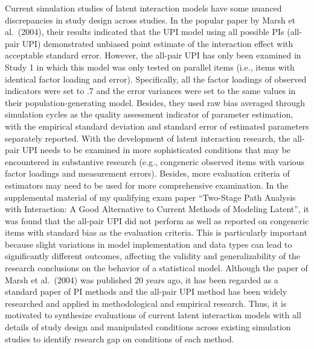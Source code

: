 \documentclass[
  11pt,
  man]{apa6}
\begin{document}
Current simulation studies of latent interaction models have some nuanced discrepancies in study design across studies. In the popular paper by Marsh et al.~(2004), their results indicated that the UPI model using all possible PIs (all-pair UPI) demonstrated unbiased point estimate of the interaction effect with acceptable standard error. However, the all-pair UPI has only been examined in Study 1 in which this model was only tested on parallel items (i.e., items with identical factor loading and error). Specifically, all the factor loadings of observed indicators were set to .7 and the error variances were set to the same values in their population-generating model. Besides, they used raw bias averaged through simulation cycles as the quality assessment indicator of parameter estimation, with the empirical standard deviation and standard error of estimated parameters separately reported. With the development of latent interaction research, the all-pair UPI needs to be examined in more sophisticated conditions that may be encountered in substantive research (e.g., congeneric observed items with various factor loadings and measurement errors). Besides, more evaluation criteria of estimators may need to be used for more comprehensive examination. In the supplemental material of my qualifying exam paper ``Two-Stage Path Analysis with Interaction: A Good Alternative to Current Methods of Modeling Latent'', it was found that the all-pair UPI did not perform as well as reported on congeneric items with standard bias as the evaluation criteria. This is particularly important because slight variations in model implementation and data types can lead to significantly different outcomes, affecting the validity and generalizability of the research conclusions on the behavior of a statistical model. Although the paper of Marsh et al.~(2004) was published 20 years ago, it has been regarded as a standard paper of PI methods and the all-pair UPI method has been widely researched and applied in methodological and empirical research. Thus, it is motivated to synthesize evaluations of current latent interaction models with all details of study design and manipulated conditions across existing simulation studies to identify research gap on conditions of each method.
\end{document}
